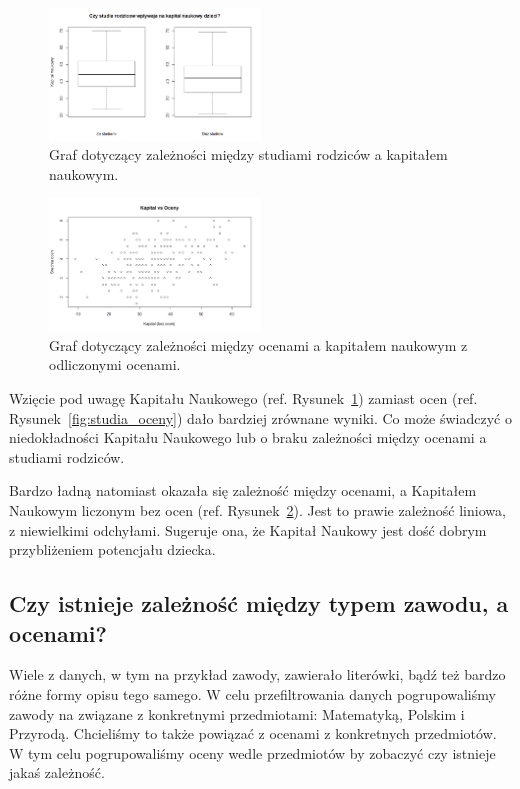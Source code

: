 \documentclass[conference]{IEEEtran}
\begin{document}
\begin{figure}
	\centering
	\includegraphics[width=0.5\textwidth]{6.png}
	\caption{Graf dotyczący zależności między studiami rodziców a kapitałem naukowym.}
	\label{fig:studia_kapital}
\end{figure}
\begin{figure}
	\centering
	\includegraphics[width=0.5\textwidth]{7.png}
	\caption{Graf dotyczący zależności między ocenami a kapitałem naukowym z odliczonymi ocenami.}
	\label{fig:oceny_kapital}
\end{figure}

Wzięcie pod uwagę Kapitału Naukowego (ref. Rysunek~\ref{fig:studia_kapital}) zamiast ocen (ref. Rysunek~\ref{fig:studia_oceny}) dało bardziej zrównane wyniki. Co może świadczyć o niedokładności Kapitału Naukowego lub o braku zależności między ocenami a studiami rodziców.

Bardzo ładną natomiast okazała się zależność między ocenami, a Kapitałem Naukowym liczonym bez ocen (ref. Rysunek~\ref{fig:oceny_kapital}). Jest to prawie zależność liniowa, z niewielkimi odchyłami. Sugeruje ona, że Kapitał Naukowy jest dość dobrym przybliżeniem potencjału dziecka.

\subsection{Czy istnieje zależność między typem zawodu, a ocenami?}
Wiele z danych, w tym na przykład zawody, zawierało literówki, bądź też bardzo różne formy opisu tego samego. W celu przefiltrowania danych pogrupowaliśmy zawody na związane z konkretnymi przedmiotami: Matematyką, Polskim i Przyrodą.
Chcieliśmy to także powiązać z ocenami z konkretnych przedmiotów. W tym celu pogrupowaliśmy oceny wedle przedmiotów by zobaczyć czy istnieje jakaś zależność.
\end{document}
